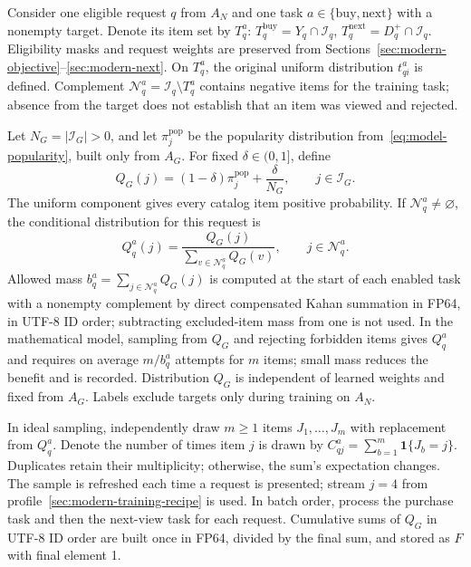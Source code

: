 \documentclass[12pt,a4paper]{article}
\newcommand{\ind}{\mathbf 1}
\theoremstyle{plainru}
\begin{document}
Consider one eligible request $q$ from $A_N$ and one task
$a\in\{\mathrm{buy},\mathrm{next}\}$ with a nonempty target.
Denote its item set by $T_q^a$:
$T_q^{\mathrm{buy}}=Y_q\cap\mathcal I_q$,
$T_q^{\mathrm{next}}=D_q^+\cap\mathcal I_q$.
Eligibility masks and request weights are preserved
from Sections~\ref{sec:modern-objective}--\ref{sec:modern-next}.
On $T_q^a$, the original uniform distribution $t_{qi}^a$ is defined.
Complement $\mathcal N_q^a=\mathcal I_q\setminus T_q^a$ contains
negative items for the training task; absence from the target does not establish
that an item was viewed and rejected.

Let $N_G=|\mathcal I_G|>0$, and let $\pi_j^{\mathrm{pop}}$ be
the popularity distribution from~\eqref{eq:model-popularity},
built only from $A_G$. For fixed $\delta\in(0,1]$,
define
\begin{equation}\label{eq:sampled-base-proposal}
Q_G(j)=(1-\delta)\pi_j^{\mathrm{pop}}+\frac{\delta}{N_G},
\qquad j\in\mathcal I_G.
\end{equation}
The uniform component gives every catalog item
positive probability. If $\mathcal N_q^a\ne\varnothing$,
the conditional distribution for this request is
\begin{equation}\label{eq:sampled-proposal}
Q_q^a(j)=
\frac{Q_G(j)}
{\sum_{v\in\mathcal N_q^a}Q_G(v)},
\qquad j\in\mathcal N_q^a.
\end{equation}
Allowed mass $b_q^a=\sum_{j\in\mathcal N_q^a}Q_G(j)$
is computed at the start of each enabled task with a nonempty complement
by direct compensated Kahan summation in FP64, in UTF-8 ID order;
subtracting excluded-item mass from one is not used.
In the mathematical model, sampling from $Q_G$ and rejecting forbidden
items gives $Q_q^a$ and requires on average $m/b_q^a$ attempts for $m$
items; small mass reduces the benefit and is recorded.
Distribution $Q_G$ is independent of learned weights and fixed from $A_G$.
Labels exclude targets only during training on $A_N$.

In ideal sampling, independently draw $m\ge1$ items
$J_1,\ldots,J_m$ with replacement from $Q_q^a$.
Denote the number of times item $j$ is drawn by
$C_{qj}^a=\sum_{b=1}^{m}\ind\{J_b=j\}$.
Duplicates retain their multiplicity; otherwise, the sum's expectation changes.
The sample is refreshed each time a request is presented;
stream $j=4$ from profile~\ref{sec:modern-training-recipe} is used.
In batch order, process the purchase task and then the next-view
task for each request. Cumulative sums of $Q_G$ in UTF-8 ID order
are built once in FP64, divided by the final sum, and stored as $F$
with final element 1.
\end{document}
